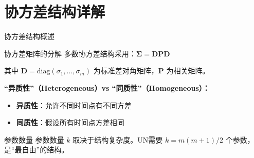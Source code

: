 \documentclass[aspectratio=169,11pt]{beamer}
\newcommand{\bSigma}{\boldsymbol{\Sigma}}
\newcommand{\bD}{\mathbf{D}}
\newcommand{\bP}{\mathbf{P}}
\newcommand{\diag}{\mathrm{diag}}
\begin{document}
\section{协方差结构详解}

\begin{frame}{协方差结构概述}
\begin{block}{协方差矩阵的分解}
多数协方差结构采用：$\bSigma = \bD \bP \bD$

其中 $\bD = \diag(\sigma_1, \dots, \sigma_m)$ 为标准差对角矩阵，$\bP$ 为相关矩阵。
\end{block}

\textbf{``异质性''（Heterogeneous）vs ``同质性''（Homogeneous）：}
\begin{itemize}
    \item \textbf{异质性}：允许不同时间点有不同方差
    \item \textbf{同质性}：假设所有时间点方差相同
\end{itemize}

\begin{alertblock}{参数数量}
参数数量 $k$ 取决于结构复杂度。UN需要 $k = m(m+1)/2$ 个参数，是``最自由''的结构。
\end{alertblock}
\end{frame}
\end{document}
